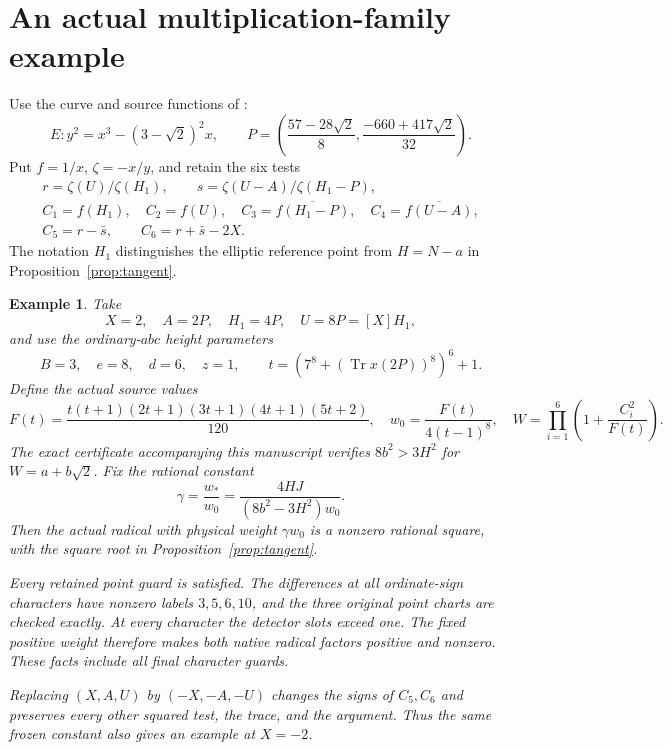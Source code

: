 \documentclass[11pt,a4paper]{article}
\newtheorem{example}[proposition]{Example}
\DeclareMathOperator{\Tr}{Tr}\DeclareMathOperator{\Nm}{N}
\begin{document}
\section{An actual multiplication-family example}

Use the curve and source functions of \cite{Single}:
\[
 E:y^2=x^3-(3-\sqrt2)^2x,\qquad
 P=\left(\frac{57-28\sqrt2}{8},\frac{-660+417\sqrt2}{32}\right).
\]
Put $f=1/x$, $\zeta=-x/y$, and retain the six tests
\[
 \begin{gathered}
 r=\zeta(U)/\zeta(H_1),\qquad
 s=\zeta(U-A)/\zeta(H_1-P),\\
 C_1=f(H_1),\quad C_2=f(U),\quad
 C_3=\overline{f(H_1-P)},\quad C_4=\overline{f(U-A)},\\
 C_5=r-\bar s,\qquad C_6=r+\bar s-2X.
 \end{gathered}
\]
The notation $H_1$ distinguishes the elliptic reference point from
$H=N-a$ in Proposition~\ref{prop:tangent}.

\begin{example}\label{ex:two}
Take
\[
 X=2,\quad A=2P,\quad H_1=4P,\quad U=8P=[X]H_1,
\]
and use the ordinary-$abc$ height parameters
\[
 B=3,\quad e=8,\quad d=6,\quad z=1,\qquad
 t=\left(7^8+(\Tr x(2P))^8\right)^6+1.
\]
Define the actual source values
\[
 F(t)=\frac{t(t+1)(2t+1)(3t+1)(4t+1)(5t+2)}{120},
 \quad w_0=\frac{F(t)}{4(t-1)^8},\quad
 W=\prod_{i=1}^6\left(1+\frac{C_i^2}{F(t)}\right).
\]
The exact certificate accompanying this manuscript verifies
$8b^2>3H^2$ for $W=a+b\sqrt2$. Fix the rational constant
\begin{equation}\label{eq:gamma}
 \gamma=\frac{w_*}{w_0}
 =\frac{4HJ}{(8b^2-3H^2)w_0}.
\end{equation}
Then the actual radical with physical weight $\gamma w_0$ is a
nonzero rational square, with the square root in
Proposition~\ref{prop:tangent}.

Every retained point guard is satisfied. The differences at all
ordinate-sign characters have nonzero labels $3,5,6,10$, and the
three original point charts are checked exactly. At every character
the detector slots exceed one. The fixed positive weight therefore
makes both native radical factors positive and nonzero. These facts
include all final character guards.

Replacing $(X,A,U)$ by $(-X,-A,-U)$ changes the signs of $C_5,C_6$
and preserves every other squared test, the trace, and the argument.
Thus the same frozen constant also gives an example at $X=-2$.
\end{example}
\end{document}
